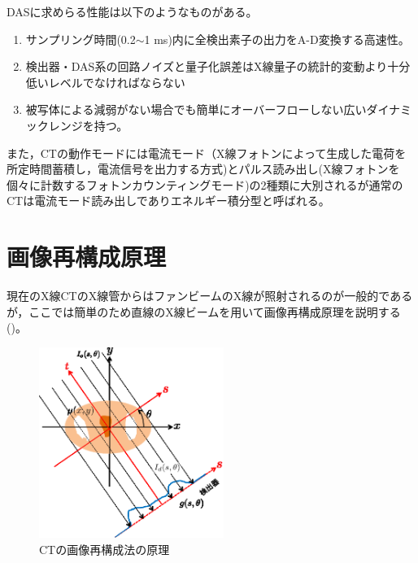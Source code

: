 DASに求めらる性能は以下のようなものがある。
\begin{enumerate}
\item サンプリング時間(0.2$\sim$1 ms)内に全検出素子の出力をA-D変換する高速性。
\item 検出器・DAS系の回路ノイズと量子化誤差はX線量子の統計的変動より十分低いレベルでなければならない
\item 被写体による減弱がない場合でも簡単にオーバーフローしない広いダイナミックレンジを持つ。
\end{enumerate}



また，CTの動作モードには電流モード（X線フォトンによって生成した電荷を所定時間蓄積し，電流信号を出力する方式)とパルス読み出し(X線フォトンを個々に計数するフォトンカウンティングモード)の2種類に大別されるが通常のCTは電流モード読み出しでありエネルギー積分型と呼ばれる。





\section{画像再構成原理}
現在のX線CTのX線管からはファンビームのX線が照射されるのが一般的であるが，ここでは簡単のため直線のX線ビームを用いて画像再構成原理を説明する()。

\begin{figure}[H]
 \begin{center}
 \includegraphics[width=6cm]{image/other/FBP.eps}
 \end{center}
 \caption{CTの画像再構成法の原理}
 \label{fig:FBP}
\end{figure}

